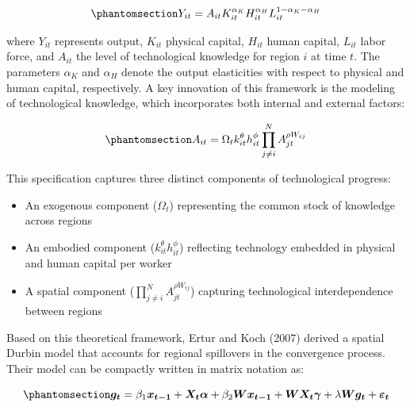 \documentclass[
  letterpaper,
  DIV=11,
  numbers=noendperiod]{scrartcl}
\providecommand{\tightlist}{%
  \setlength{\itemsep}{0pt}\setlength{\parskip}{0pt}}
\begin{document}
\begin{equation}\phantomsection\label{eq-production}{
Y_{i t}=A_{i t} K_{i t}^{\alpha_{K}} H_{i t}^{\alpha_{H}} L_{i t}^{1-\alpha_{K} -\alpha_{H}}
}\end{equation}

where \(Y_{it}\) represents output, \(K_{it}\) physical capital,
\(H_{it}\) human capital, \(L_{it}\) labor force, and \(A_{it}\) the
level of technological knowledge for region \(i\) at time \(t\). The
parameters \(\alpha_K\) and \(\alpha_H\) denote the output elasticities
with respect to physical and human capital, respectively. A key
innovation of this framework is the modeling of technological knowledge,
which incorporates both internal and external factors:

\begin{equation}\phantomsection\label{eq-technology}{
A_{i t}=\Omega_{t} k_{i t}^{\theta} h_{i t}^{\phi} \prod_{j \neq i}^{N} A_{j t}^{\rho W_{i j}}
}\end{equation}

This specification captures three distinct components of technological
progress:

\begin{itemize}
\tightlist
\item
  An exogenous component (\(\Omega_t\)) representing the common stock of
  knowledge across regions
\item
  An embodied component (\(k_{i t}^{\theta} h_{i t}^{\phi}\)) reflecting
  technology embedded in physical and human capital per worker
\item
  A spatial component (\(\prod_{j \neq i}^{N} A_{j t}^{\rho W_{i j}}\))
  capturing technological interdependence between regions
\end{itemize}

Based on this theoretical framework, Ertur and Koch (2007) derived a
spatial Durbin model that accounts for regional spillovers in the
convergence process. Their model can be compactly written in matrix
notation as:

\begin{equation}\phantomsection\label{eq-matrix_form}{
\boldsymbol{g_t} =  \beta_1 \boldsymbol{x_{t-1}} + \boldsymbol{X_t} \boldsymbol{\alpha} + \beta_2 \boldsymbol{W} \boldsymbol{x_{t-1}} + \boldsymbol{W} \boldsymbol{X_t} \boldsymbol{\gamma} + \lambda \boldsymbol{W} \boldsymbol{g_t}  + \boldsymbol{\varepsilon_t}
}\end{equation}
\end{document}
